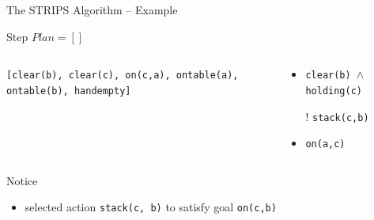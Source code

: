 \documentclass[presentation]{beamer}\mode<presentation>{\usetheme{AMSBolognaFC}}
\begin{document}
\begin{frame}[c]{The STRIPS Algorithm -- Example}
\small

	\begin{exampleblock}{Step \nextStripsExampleStep{} \hfill $Plan = []$}
		\begin{columns}[t]
			\begin{column}{.30\linewidth}\centering
				\texttt{[clear(b), clear(c), on(c,a), ontable(a), ontable(b), handempty]}
			\end{column}
			\begin{column}{.50\linewidth}\centering
				\begin{itemize}
					\item \texttt{clear(b) $\wedge$ holding(c)}
					\item[!] \texttt{stack(c,b)}
					\item \texttt{on(a,c)}
				\end{itemize}
			\end{column}
			\begin{column}{.10\linewidth}\centering
				
			\end{column}
		\end{columns}
	\end{exampleblock}

	\vfill

	\footnotesize
	Notice
	\begin{itemize}\tiny
	    \item selected action \texttt{stack(c, b)} to satisfy goal \texttt{on(c,b)}
	\end{itemize}

\end{frame}
\end{document}
